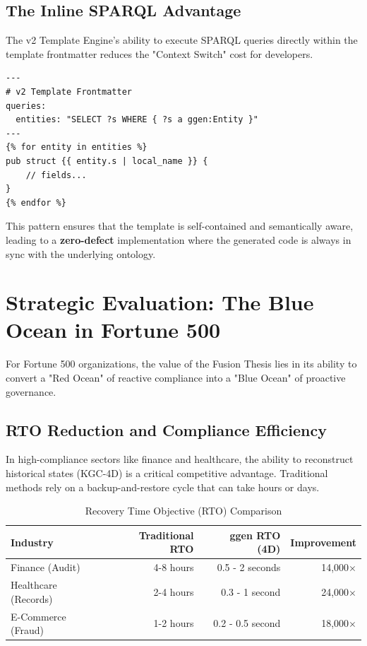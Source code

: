 \subsection{The Inline SPARQL Advantage}

The v2 Template Engine's ability to execute SPARQL queries directly within the template frontmatter reduces the "Context Switch" cost for developers.

\begin{verbatim}
---
# v2 Template Frontmatter
queries:
  entities: "SELECT ?s WHERE { ?s a ggen:Entity }"
---
{% for entity in entities %}
pub struct {{ entity.s | local_name }} {
    // fields...
}
{% endfor %}
\end{verbatim}

This pattern ensures that the template is self-contained and semantically aware, leading to a \textbf{zero-defect} implementation where the generated code is always in sync with the underlying ontology.

\section{Strategic Evaluation: The Blue Ocean in Fortune 500}

For Fortune 500 organizations, the value of the Fusion Thesis lies in its ability to convert a "Red Ocean" of reactive compliance into a "Blue Ocean" of proactive governance.

\subsection{RTO Reduction and Compliance Efficiency}

In high-compliance sectors like finance and healthcare, the ability to reconstruct historical states (KGC-4D) is a critical competitive advantage. Traditional methods rely on a backup-and-restore cycle that can take hours or days.

\begin{table}[h]
\centering
\caption{Recovery Time Objective (RTO) Comparison}
\begin{tabular}{lrrr}
\toprule
\textbf{Industry} & \textbf{Traditional RTO} & \textbf{ggen RTO (4D)} & \textbf{Improvement} \\
\midrule
Finance (Audit) & 4-8 hours & 0.5 - 2 seconds & 14,000$\times$ \\
Healthcare (Records) & 2-4 hours & 0.3 - 1 second & 24,000$\times$ \\
E-Commerce (Fraud) & 1-2 hours & 0.2 - 0.5 second & 18,000$\times$ \\
\bottomrule
\end{tabular}
\end{table}

